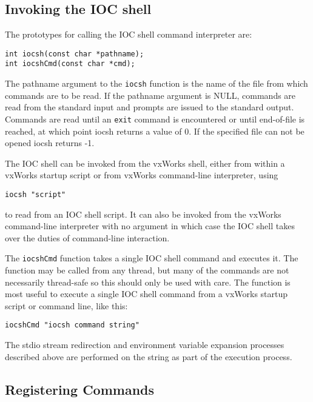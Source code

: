 \subsection{Invoking the IOC shell}

The prototypes for calling the IOC shell command interpreter are:

\begin{verbatim}
int iocsh(const char *pathname);
int iocshCmd(const char *cmd);
\end{verbatim}

The pathname argument to the \verb|iocsh| function is the name of the file from which commands are to be read.  If the 
pathname argument is NULL, commands are read from the standard input and prompts are issued to the standard output.  
Commands are read until an \verb|exit| command is encountered or until end-of-file is reached, at which point iocsh returns a 
value of 0.  If the specified file can not be opened iocsh returns -1.

The IOC shell can be invoked from  the vxWorks shell, either from within a vxWorks startup script or from vxWorks 
command-line interpreter, using

\begin{verbatim}
iocsh "script"
\end{verbatim}

to read from an IOC shell script.  It can also be invoked from the vxWorks command-line interpreter with no argument in 
which case the IOC shell takes over the duties of command-line interaction.

The \verb|iocshCmd| function takes a single IOC shell command and executes it. The function may be called from any thread, 
but many of the commands are not necessarily thread-safe so this should only be used with care. The function is most 
useful to execute a single IOC shell command from a vxWorks startup script or command line, like this:

\begin{verbatim}
iocshCmd "iocsh command string"
\end{verbatim}

The stdio stream redirection and environment variable expansion processes described above are performed on the string 
as part of the execution process.

\subsection{Registering Commands}

